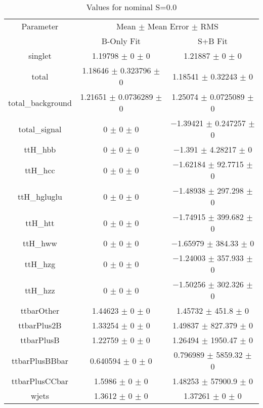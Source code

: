 \begin{table}
\centering
\caption{Values for nominal S=0.0}
\begin{tabular}{ccc}
\toprule
Parameter & \multicolumn{2}{c}{Mean $\pm$ Mean Error $\pm$ RMS}\\
 & B-Only Fit & S+B Fit\\
\midrule
singlet & \num{1.19798} $\pm$ \num{0} $\pm$ \num{0} & \num{1.21887} $\pm$ \num{0} $\pm$ \num{0}\\
total & \num{1.18646} $\pm$ \num{0.323796} $\pm$ \num{0} & \num{1.18541} $\pm$ \num{0.32243} $\pm$ \num{0}\\
total\_background & \num{1.21651} $\pm$ \num{0.0736289} $\pm$ \num{0} & \num{1.25074} $\pm$ \num{0.0725089} $\pm$ \num{0}\\
total\_signal & \num{0} $\pm$ \num{0} $\pm$ \num{0} & \num{-1.39421} $\pm$ \num{0.247257} $\pm$ \num{0}\\
ttH\_hbb & \num{0} $\pm$ \num{0} $\pm$ \num{0} & \num{-1.391} $\pm$ \num{4.28217} $\pm$ \num{0}\\
ttH\_hcc & \num{0} $\pm$ \num{0} $\pm$ \num{0} & \num{-1.62184} $\pm$ \num{92.7715} $\pm$ \num{0}\\
ttH\_hgluglu & \num{0} $\pm$ \num{0} $\pm$ \num{0} & \num{-1.48938} $\pm$ \num{297.298} $\pm$ \num{0}\\
ttH\_htt & \num{0} $\pm$ \num{0} $\pm$ \num{0} & \num{-1.74915} $\pm$ \num{399.682} $\pm$ \num{0}\\
ttH\_hww & \num{0} $\pm$ \num{0} $\pm$ \num{0} & \num{-1.65979} $\pm$ \num{384.33} $\pm$ \num{0}\\
ttH\_hzg & \num{0} $\pm$ \num{0} $\pm$ \num{0} & \num{-1.24003} $\pm$ \num{357.933} $\pm$ \num{0}\\
ttH\_hzz & \num{0} $\pm$ \num{0} $\pm$ \num{0} & \num{-1.50256} $\pm$ \num{302.326} $\pm$ \num{0}\\
ttbarOther & \num{1.44623} $\pm$ \num{0} $\pm$ \num{0} & \num{1.45732} $\pm$ \num{451.8} $\pm$ \num{0}\\
ttbarPlus2B & \num{1.33254} $\pm$ \num{0} $\pm$ \num{0} & \num{1.49837} $\pm$ \num{827.379} $\pm$ \num{0}\\
ttbarPlusB & \num{1.22759} $\pm$ \num{0} $\pm$ \num{0} & \num{1.26494} $\pm$ \num{1950.47} $\pm$ \num{0}\\
ttbarPlusBBbar & \num{0.640594} $\pm$ \num{0} $\pm$ \num{0} & \num{0.796989} $\pm$ \num{5859.32} $\pm$ \num{0}\\
ttbarPlusCCbar & \num{1.5986} $\pm$ \num{0} $\pm$ \num{0} & \num{1.48253} $\pm$ \num{57900.9} $\pm$ \num{0}\\
wjets & \num{1.3612} $\pm$ \num{0} $\pm$ \num{0} & \num{1.37261} $\pm$ \num{0} $\pm$ \num{0}\\
\bottomrule
\end{tabular}
\end{table}